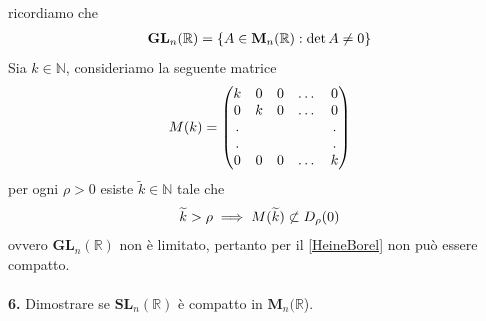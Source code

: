 \documentclass[oneside, 11pt]{amsbook}
\makeatletter
\newcommand{\0}{{(0)}}
\newcommand{\3}{{(3)}}
\theoremstyle{colonplain}
\theoremstyle{colondefinition}
\theoremstyle{colonremark}
\numberwithin{equation}{chapter}
\renewcommand{\proofname}{Dimostrazione}
\renewenvironment{proof}[1][\proofname]{\par
  \pushQED{\qed}%
  \normalfont \topsep6\p@\@plus6\p@\relax
  \trivlist
  \item[\hskip\labelsep\bfseries #1:]\ignorespaces
}{%
  \popQED\endtrivlist\@endpefalse
}
\makeatother
\begin{document}
\begin{proof} ricordiamo che
\begin{align}
    \mathbf{GL}_n(\mathbb{R}) = \{ A \in \mathbf{M}_n(\mathbb{R}) : \det A \neq 0 \} \notag
\end{align}
Sia $k \in \mathbb{N}$, consideriamo la seguente matrice
\begin{align}
    M(k) = \begin{pmatrix}
        k & 0 & 0 & \dots & 0 \\
        0 & k & 0 & \dots & 0 \\
        . & & & & . \\
        . & & & & . \\
        0 & 0 & 0 & \dots & k
    \end{pmatrix} \notag
\end{align}
per ogni $\rho > 0$ esiste $\widetilde{k} \in \mathbb{N}$ tale che
\begin{align}
    \widetilde{k} > \rho \implies M(\widetilde{k}) \not\subset D_\rho(0) \notag
\end{align}
ovvero $\mathbf{GL}_n(\mathbb{R})$ non è limitato, pertanto per il \cref{HeineBorel} non può essere compatto. \\ \\
\end{proof}
\textbf{6.} Dimostrare se $\textbf{SL}_n(\mathbb{R})$ è compatto in $\mathbf{M}_n(\mathbb{R}$). \\
\end{document}
